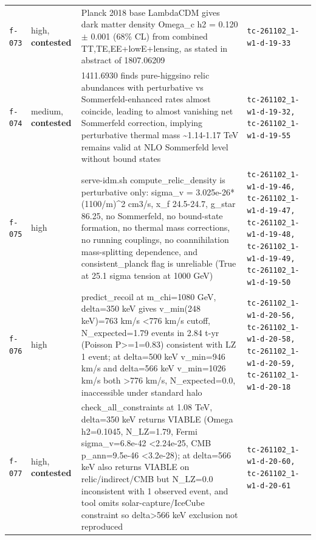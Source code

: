 \documentclass[11pt,a4paper]{article}
\begin{document}
\begin{longtable}{@{}p{}p{}p{}p{}@{}}
\texttt{f-073} & high, \textbf{contested} & Planck 2018 base LambdaCDM gives dark matter density Omega\_c h2 = 0.120 $\pm$ 0.001 (68\% CL) from combined TT,TE,EE+lowE+lensing, as stated in abstract of 1807.06209 & \texttt{tc-261102\_\allowbreak{}1-w1-d-19-33} \\
\texttt{f-074} & medium, \textbf{contested} & 1411.6930 finds pure-higgsino relic abundances with perturbative vs Sommerfeld-enhanced rates almost coincide, leading to almost vanishing net Sommerfeld correction, implying perturbative thermal mass \textasciitilde{}1.14-1.17 TeV remains valid at NLO Sommerfeld level without bound states & \texttt{tc-261102\_\allowbreak{}1-w1-d-19-32,\allowbreak{} tc-261102\_\allowbreak{}1-w1-d-19-55} \\
\texttt{f-075} & high & serve-idm.sh compute\_relic\_density is perturbative only: sigma\_v = 3.025e-26*(1100/m)\textasciicircum{}2 cm3/s, x\_f 24.5-24.7, g\_star 86.25, no Sommerfeld, no bound-state formation, no thermal mass corrections, no running couplings, no coannihilation mass-splitting dependence, and consistent\_planck flag is unreliable (True at 25.1 sigma tension at 1000 GeV) & \texttt{tc-261102\_\allowbreak{}1-w1-d-19-46,\allowbreak{} tc-261102\_\allowbreak{}1-w1-d-19-47,\allowbreak{} tc-261102\_\allowbreak{}1-w1-d-19-48,\allowbreak{} tc-261102\_\allowbreak{}1-w1-d-19-49,\allowbreak{} tc-261102\_\allowbreak{}1-w1-d-19-50} \\
\texttt{f-076} & high & predict\_recoil at m\_chi=1080 GeV, delta=350 keV gives v\_min(248 keV)=763 km/s \textless{}776 km/s cutoff, N\_expected=1.79 events in 2.84 t-yr (Poisson P\textgreater{}=1=0.83) consistent with LZ 1 event; at delta=500 keV v\_min=946 km/s and delta=566 keV v\_min=1026 km/s both \textgreater{}776 km/s, N\_expected=0.0, inaccessible under standard halo & \texttt{tc-261102\_\allowbreak{}1-w1-d-20-56,\allowbreak{} tc-261102\_\allowbreak{}1-w1-d-20-58,\allowbreak{} tc-261102\_\allowbreak{}1-w1-d-20-59,\allowbreak{} tc-261102\_\allowbreak{}1-w1-d-20-18} \\
\texttt{f-077} & high, \textbf{contested} & check\_all\_constraints at 1.08 TeV, delta=350 keV returns VIABLE (Omega h2=0.1045, N\_LZ=1.79, Fermi sigma\_v=6.8e-42 \textless{}2.24e-25, CMB p\_ann=9.5e-46 \textless{}3.2e-28); at delta=566 keV also returns VIABLE on relic/indirect/CMB but N\_LZ=0.0 inconsistent with 1 observed event, and tool omits solar-capture/IceCube constraint so delta\textgreater{}566 keV exclusion not reproduced & \texttt{tc-261102\_\allowbreak{}1-w1-d-20-60,\allowbreak{} tc-261102\_\allowbreak{}1-w1-d-20-61} \\

\end{longtable}
\end{document}
